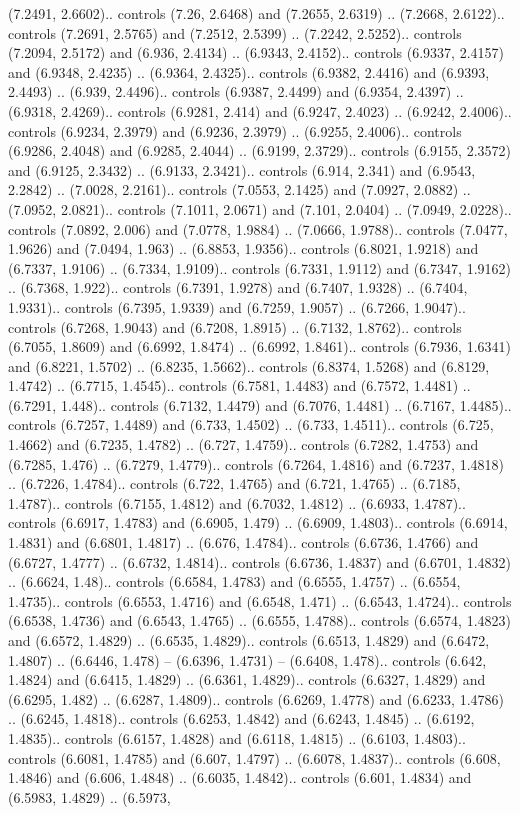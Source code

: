 (7.2491, 2.6602).. controls (7.26, 2.6468) and (7.2655, 2.6319) .. (7.2668, 2.6122).. controls (7.2691, 2.5765) and (7.2512, 2.5399) .. (7.2242, 2.5252).. controls (7.2094, 2.5172) and (6.936, 2.4134) .. (6.9343, 2.4152).. controls (6.9337, 2.4157) and (6.9348, 2.4235) .. (6.9364, 2.4325).. controls (6.9382, 2.4416) and (6.9393, 2.4493) .. (6.939, 2.4496).. controls (6.9387, 2.4499) and (6.9354, 2.4397) .. (6.9318, 2.4269).. controls (6.9281, 2.414) and (6.9247, 2.4023) .. (6.9242, 2.4006).. controls (6.9234, 2.3979) and (6.9236, 2.3979) .. (6.9255, 2.4006).. controls (6.9286, 2.4048) and (6.9285, 2.4044) .. (6.9199, 2.3729).. controls (6.9155, 2.3572) and (6.9125, 2.3432) .. (6.9133, 2.3421).. controls (6.914, 2.341) and (6.9543, 2.2842) .. (7.0028, 2.2161).. controls (7.0553, 2.1425) and (7.0927, 2.0882) .. (7.0952, 2.0821).. controls (7.1011, 2.0671) and (7.101, 2.0404) .. (7.0949, 2.0228).. controls (7.0892, 2.006) and (7.0778, 1.9884) .. (7.0666, 1.9788).. controls (7.0477, 1.9626) and (7.0494, 1.963) .. (6.8853, 1.9356).. controls (6.8021, 1.9218) and (6.7337, 1.9106) .. (6.7334, 1.9109).. controls (6.7331, 1.9112) and (6.7347, 1.9162) .. (6.7368, 1.922).. controls (6.7391, 1.9278) and (6.7407, 1.9328) .. (6.7404, 1.9331).. controls (6.7395, 1.9339) and (6.7259, 1.9057) .. (6.7266, 1.9047).. controls (6.7268, 1.9043) and (6.7208, 1.8915) .. (6.7132, 1.8762).. controls (6.7055, 1.8609) and (6.6992, 1.8474) .. (6.6992, 1.8461).. controls (6.7936, 1.6341) and (6.8221, 1.5702) .. (6.8235, 1.5662).. controls (6.8374, 1.5268) and (6.8129, 1.4742) .. (6.7715, 1.4545).. controls (6.7581, 1.4483) and (6.7572, 1.4481) .. (6.7291, 1.448).. controls (6.7132, 1.4479) and (6.7076, 1.4481) .. (6.7167, 1.4485).. controls (6.7257, 1.4489) and (6.733, 1.4502) .. (6.733, 1.4511).. controls (6.725, 1.4662) and (6.7235, 1.4782) .. (6.727, 1.4759).. controls (6.7282, 1.4753) and (6.7285, 1.476) .. (6.7279, 1.4779).. controls (6.7264, 1.4816) and (6.7237, 1.4818) .. (6.7226, 1.4784).. controls (6.722, 1.4765) and (6.721, 1.4765) .. (6.7185, 1.4787).. controls (6.7155, 1.4812) and (6.7032, 1.4812) .. (6.6933, 1.4787).. controls (6.6917, 1.4783) and (6.6905, 1.479) .. (6.6909, 1.4803).. controls (6.6914, 1.4831) and (6.6801, 1.4817) .. (6.676, 1.4784).. controls (6.6736, 1.4766) and (6.6727, 1.4777) .. (6.6732, 1.4814).. controls (6.6736, 1.4837) and (6.6701, 1.4832) .. (6.6624, 1.48).. controls (6.6584, 1.4783) and (6.6555, 1.4757) .. (6.6554, 1.4735).. controls (6.6553, 1.4716) and (6.6548, 1.471) .. (6.6543, 1.4724).. controls (6.6538, 1.4736) and (6.6543, 1.4765) .. (6.6555, 1.4788).. controls (6.6574, 1.4823) and (6.6572, 1.4829) .. (6.6535, 1.4829).. controls (6.6513, 1.4829) and (6.6472, 1.4807) .. (6.6446, 1.478) -- (6.6396, 1.4731) -- (6.6408, 1.478).. controls (6.642, 1.4824) and (6.6415, 1.4829) .. (6.6361, 1.4829).. controls (6.6327, 1.4829) and (6.6295, 1.482) .. (6.6287, 1.4809).. controls (6.6269, 1.4778) and (6.6233, 1.4786) .. (6.6245, 1.4818).. controls (6.6253, 1.4842) and (6.6243, 1.4845) .. (6.6192, 1.4835).. controls (6.6157, 1.4828) and (6.6118, 1.4815) .. (6.6103, 1.4803).. controls (6.6081, 1.4785) and (6.607, 1.4797) .. (6.6078, 1.4837).. controls (6.608, 1.4846) and (6.606, 1.4848) .. (6.6035, 1.4842).. controls (6.601, 1.4834) and (6.5983, 1.4829) .. (6.5973, 
